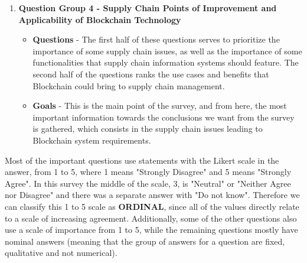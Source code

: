 \begin{enumerate}
\item \textbf{Question Group 4 - Supply Chain Points of Improvement and Applicability of Blockchain Technology} 
	\begin{itemize}
    \item \textbf{Questions} - The first half of these questions serves to prioritize the importance of some supply chain issues, as well as the importance of some functionalities that supply chain information systems should feature. The second half of the questions ranks the use cases and benefits that Blockchain could bring to supply chain management.
    \item \textbf{Goals} - This is the main point of the survey, and from here, the most important information towards the conclusions we want from the survey is gathered, which consists in the supply chain issues leading to Blockchain system requirements.
	\end{itemize}
    
\end{enumerate}


\par Most of the important questions use statements with the Likert scale in the answer, from 1 to 5, where 1 means "Strongly Disagree" and 5 means "Strongly Agree". In this survey the middle of the scale, 3, is "Neutral" or "Neither Agree nor Disagree" and there was a separate answer with "Do not know". Therefore we can classify this 1 to 5 scale as \textbf{ORDINAL}, since all of the values directly relate to a scale of increasing agreement. Additionally, some of the other questions also use a scale of importance from 1 to 5, while the remaining questions mostly have nominal answers (meaning that the group of answers for a question are fixed, qualitative and not numerical). 

